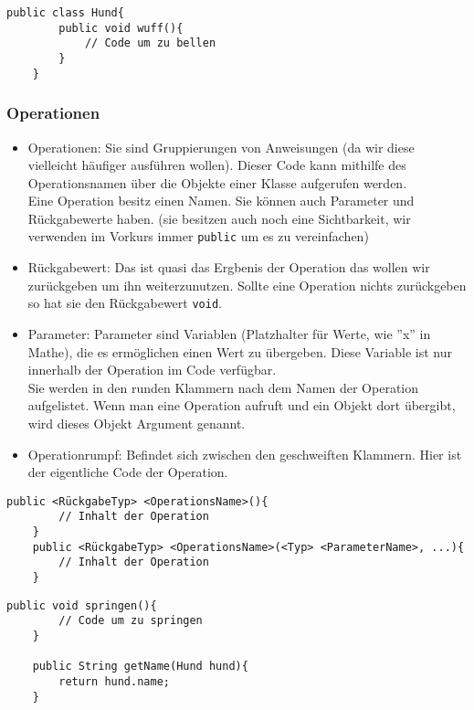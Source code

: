 \begin{lstlisting}[title=\textbf{Klassen Beispiel}]
	public class Hund{
		public void wuff(){
			// Code um zu bellen
		}
	}
\end{lstlisting}
\begin{Infobox}
	\subsubsection*{Operationen}
	\begin{itemize}
		\item Operationen: Sie sind Gruppierungen von Anweisungen (da wir diese vielleicht häufiger ausführen wollen).
			Dieser Code kann mithilfe des Operationsnamen über die Objekte einer Klasse aufgerufen werden.\\
			Eine Operation besitz einen Namen. Sie können auch Parameter und Rückgabewerte haben. (sie besitzen auch noch eine Sichtbarkeit, wir verwenden im Vorkurs immer \lstinline{public} um es zu vereinfachen)
		\item Rückgabewert: Das ist quasi das Ergbenis der Operation das wollen wir zurückgeben um ihn weiterzunutzen.
			Sollte eine Operation nichts zurückgeben so hat sie den Rückgabewert \lstinline{void}.
		\item Parameter: Parameter sind Variablen (Platzhalter für Werte, wie ''x'' in Mathe), die es ermöglichen einen Wert zu übergeben. Diese Variable ist nur innerhalb der Operation im Code verfügbar.\\
			Sie werden in den runden Klammern nach dem Namen der Operation aufgelistet.
			Wenn man eine Operation aufruft und ein Objekt dort übergibt, wird dieses Objekt Argument genannt.
		\item Operationrumpf: Befindet sich zwischen den geschweiften Klammern. Hier ist der eigentliche Code der Operation.
	\end{itemize}

\end{Infobox}

\begin{lstlisting}[title=\textbf{Operations Syntax}]
	public <RückgabeTyp> <OperationsName>(){
		// Inhalt der Operation
	}
	public <RückgabeTyp> <OperationsName>(<Typ> <ParameterName>, ...){
		// Inhalt der Operation
	}
\end{lstlisting}

\newpage

\begin{lstlisting}[title=\textbf{Operations Beispiel}]
	public void springen(){
		// Code um zu springen
	}

	public String getName(Hund hund){
		return hund.name;
	}
\end{lstlisting}

